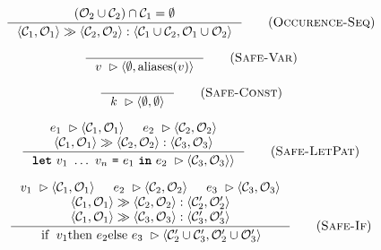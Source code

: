 \begin{figure}

\begin{equation*}
\inference{
  (\mathcal{O}_{2} \cup \mathcal{C}_{2}) \cap \mathcal{C}_{1} = \emptyset
}{
  \seqOccurences
  {\langle\mathcal{C}_{1},\mathcal{O}_{1}\rangle}
  {\langle\mathcal{C}_{2},\mathcal{O}_{2}\rangle}
  {\langle\mathcal{C}_{1}\cup\mathcal{C}_{2},\mathcal{O}_{1}\cup\mathcal{O}_{2}\rangle}
}\tagsc{Occurence-Seq}
\end{equation*}


\begin{equation*}
\inference{
}{
\inPlaceSafe{v}{\emptyset}{\aliases{v}}
}
\tagsc{Safe-Var}
\end{equation*}

\begin{equation*}
\inference{
}{
\inPlaceSafe{k}{\emptyset}{\emptyset}
}
\tagsc{Safe-Const}
\end{equation*}

\begin{equation*}
\inference{
  \inPlaceSafe{e_{1}}{\mathcal{C}_{1}}{\mathcal{O}_{1}}
  &
  \inPlaceSafe{e_{2}}{\mathcal{C}_{2}}{\mathcal{O}_{2}}
  \\
  \seqOccurences
  {\langle\mathcal{C}_{1},\mathcal{O}_{1}\rangle}
  {\langle\mathcal{C}_{2},\mathcal{O}_{2}\rangle}
  {\langle\mathcal{C}_{3},\mathcal{O}_{3}\rangle}
}{
  \inPlaceSafe{\Let{v_{1}~\ldots~v_{n}}{e_{1}}{e_{2}}}
  {\mathcal{C}_{3}}{\mathcal{O}_{3}\rangle}
}
\tagsc{Safe-LetPat}
\end{equation*}

\begin{equation*}
\inference{
  \inPlaceSafe{v_{1}}{\mathcal{C}_{1}}{\mathcal{O}_{1}}
  &
  \inPlaceSafe{e_{2}}{\mathcal{C}_{2}}{\mathcal{O}_{2}}
  &
  \inPlaceSafe{e_{3}}{\mathcal{C}_{3}}{\mathcal{O}_{3}}
  \\
  \seqOccurences
  {\langle\mathcal{C}_{1},\mathcal{O}_{1}\rangle}
  {\langle\mathcal{C}_{2},\mathcal{O}_{2}\rangle}
  {\langle\mathcal{C}_{2}',\mathcal{O}_{2}'\rangle}
  \\
  \seqOccurences
  {\langle\mathcal{C}_{1},\mathcal{O}_{1}\rangle}
  {\langle\mathcal{C}_{3},\mathcal{O}_{3}\rangle}
  {\langle\mathcal{C}_{3}',\mathcal{O}_{3}'\rangle}
}{
  \inPlaceSafe{\text{\lstinline[mathescape]!if\ $v_{1}$ then\ $e_{2}$ else\ $e_{3}$!}}
  {\mathcal{C}'_{2}\cup\mathcal{C}'_{3}}
  {\mathcal{O}'_{2}\cup\mathcal{O}'_{3}}
}
\tagsc{Safe-If}
\end{equation*}


\end{figure}
